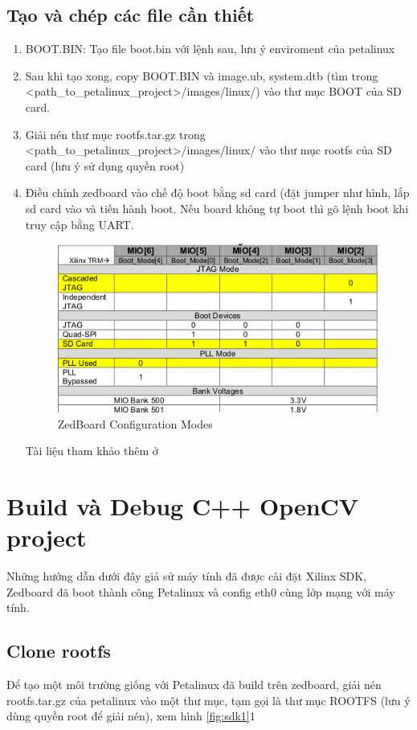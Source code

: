 \documentclass[a4paper]{report}
\begin{document}
\subsection{Tạo và chép các file cần thiết}
\begin{enumerate}
\item BOOT.BIN: Tạo file boot.bin với lệnh sau, lưu ý enviroment của petalinux

\item Sau khi tạo xong, copy BOOT.BIN và image.ub, system.dtb (tìm trong <path_to_petalinux_project>/images/linux/) vào thư mục BOOT của SD card.
\item Giải nén thư mục rootfs.tar.gz trong <path_to_petalinux_project>/images/linux/ vào thư mục rootfs của SD card (lưu ý sử dụng quyền root)

\item Điều chỉnh zedboard vào chế độ boot bằng sd card (đặt jumper như hình, lắp sd card vào và tiến hành boot. Nếu board không tự boot thì gõ lệnh boot khi truy cập bằng UART.
 \begin{figure}[H]
\centering
\includegraphics[width=.6\textwidth]{../images/fig/sd1.png}
\caption{ZedBoard Configuration Modes}
\label{fig:sd1}%
\end{figure}
Tài liệu tham khảo thêm ở \cite{sd1, sd2, sd3, sd4, sd5}
\end{enumerate}

\section{Build và Debug C++ OpenCV project}
\label{sdkguide}
Những hướng dẫn dưới đây giả sử máy tính đã được cài đặt Xilinx SDK, Zedboard đã boot thành công Petalinux và config eth0 cùng lớp mạng với máy tính.
\subsection*{Clone rootfs}
Để tạo một môi trường giống với Petalinux đã build trên zedboard, giải nén rootfs.tar.gz của petalinux vào một thư mục, tạm gọi là thư mục ROOTFS (lưu ý dùng quyền root để giải nén), xem hình \ref{fig:sdk1}1
\end{document}
